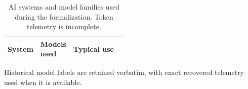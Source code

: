 \begin{table}[H]
\centering
\scriptsize
\caption{AI systems and model families used during the formalization.
Token telemetry is incomplete.}
\label{tab:formalization-systems}
\begin{tabularx}{\linewidth}{@{}p{0.20\linewidth}p{0.27\linewidth}>{\raggedright\arraybackslash}X@{}}
\toprule
System & Models used & Typical use \\
\midrule

\end{tabularx}
\end{table}

\begin{table}[H]
\centering
\scriptsize
\caption{Recovered model-resolved token measurements at the 13 August 2026
accounting cutoff.  These are measured lower bounds for the five labels with
recovered telemetry; models in \cref{tab:formalization-systems} that do not
appear here were still used.}
\label{tab:model-tokens-appendix}
\resizebox{\linewidth}{!}{}
\end{table}

Historical model labels are retained verbatim, with exact recovered telemetry used
when it is available.

